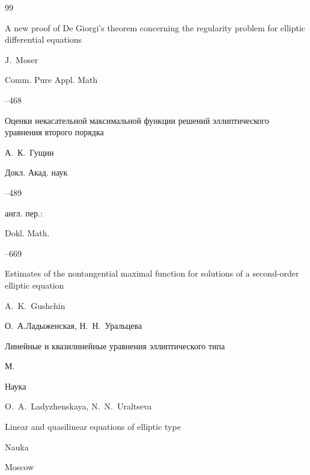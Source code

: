 \begin{thebibliography}{99}

\paper A new proof of De Giorgi's theorem concerning the regularity problem for elliptic differential equations

\by J.~Moser

\jour Comm. Pure Appl. Math




--468






\paper Оценки некасательной максимальной функции решений эллиптического уравнения второго порядка

\by А.~К.~Гущин

\jour Докл. Акад. наук




--489

\transl англ. пер.:~

\jour Dokl. Math. 




--669

\paper Estimates of the nontangential maximal function for solutions of a second-order elliptic equation

\by A.~K.~Gushchin









\by О.~А.Ладыженская, Н.~Н.~Уральцева

\book Линейные и квазилинейные уравнения эллиптического типа

\publaddr М.

\publ Наука



\misctransl O.~A.~Ladyzhenskaya, N.~N.~Uraltseva

\book Linear and quasilinear equations of elliptic type

\publ Nauka

\publaddr Moscow


\end{thebibliography}
